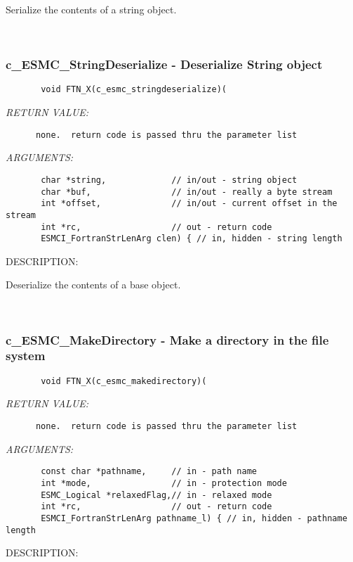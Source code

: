        Serialize the contents of a string object.
   
 
\mbox{}\hrulefill\
 
\subsubsection [c\_ESMC\_StringDeserialize] {c\_ESMC\_StringDeserialize - Deserialize String object}


  
\begin{verbatim}       void FTN_X(c_esmc_stringdeserialize)(\end{verbatim}{\em RETURN VALUE:}
\begin{verbatim}      none.  return code is passed thru the parameter list\end{verbatim}{\em ARGUMENTS:}
\begin{verbatim}       char *string,             // in/out - string object
       char *buf,                // in/out - really a byte stream
       int *offset,              // in/out - current offset in the stream
       int *rc,                  // out - return code
       ESMCI_FortranStrLenArg clen) { // in, hidden - string length\end{verbatim}
{\sf DESCRIPTION:\\ }


       Deserialize the contents of a base object.
   
 
\mbox{}\hrulefill\
 
\subsubsection [c\_ESMC\_MakeDirectory] {c\_ESMC\_MakeDirectory - Make a directory in the file system}


  
\begin{verbatim}       void FTN_X(c_esmc_makedirectory)(\end{verbatim}{\em RETURN VALUE:}
\begin{verbatim}      none.  return code is passed thru the parameter list\end{verbatim}{\em ARGUMENTS:}
\begin{verbatim}       const char *pathname,     // in - path name
       int *mode,                // in - protection mode
       ESMC_Logical *relaxedFlag,// in - relaxed mode
       int *rc,                  // out - return code
       ESMCI_FortranStrLenArg pathname_l) { // in, hidden - pathname length\end{verbatim}
{\sf DESCRIPTION:\\ }


